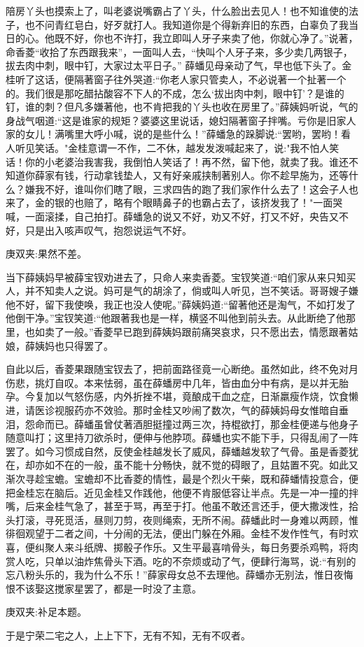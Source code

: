 \begin{parag}
陪房丫头也摸索上了，叫老婆说嘴霸占了丫头，什么脸出去见人！也不知谁使的法子，也不问青红皂白，好歹就打人。我知道你是个得新弃旧的东西，白辜负了我当日的心。他既不好，你也不许打，我立即叫人牙子来卖了他，你就心净了。”说著，命香菱“收拾了东西跟我来”，一面叫人去，“快叫个人牙子来，多少卖几两银子，拔去肉中刺，眼中钉，大家过太平日子。” 薛蟠见母亲动了气，早也低下头了。金桂听了这话，便隔著窗子往外哭道:“你老人家只管卖人，不必说著一个扯著一个的。我们很是那吃醋拈酸容不下人的不成，怎么‘拔出肉中刺，眼中钉’？是谁的钉，谁的刺？但凡多嫌著他，也不肯把我的丫头也收在房里了。”薛姨妈听说，气的身战气咽道:“这是谁家的规矩？婆婆这里说话，媳妇隔著窗子拌嘴。亏你是旧家人家的女儿！满嘴里大呼小喊，说的是些什么！”薛蟠急的跺脚说:“罢哟，罢哟！看人听见笑话。"金桂意谓一不作，二不休，越发发泼喊起来了，说:"我不怕人笑话！你的小老婆治我害我，我倒怕人笑话了！再不然，留下他，就卖了我。谁还不知道你薛家有钱，行动拿钱垫人，又有好亲戚挟制著别人。你不趁早施为，还等什么？嫌我不好，谁叫你们瞎了眼，三求四告的跑了我们家作什么去了！这会子人也来了，金的银的也赔了，略有个眼睛鼻子的也霸占去了，该挤发我了！"一面哭喊，一面滚揉，自己拍打。薛蟠急的说又不好，劝又不好，打又不好，央告又不好，只是出入咳声叹气，抱怨说运气不好。\begin{note}庚双夹:果然不差。\end{note}当下薛姨妈早被薛宝钗劝进去了，只命人来卖香菱。宝钗笑道:“咱们家从来只知买人，并不知卖人之说。妈可是气的胡涂了，倘或叫人听见，岂不笑话。哥哥嫂子嫌他不好，留下我使唤，我正也没人使呢。”薛姨妈道:“留著他还是淘气，不如打发了他倒干净。”宝钗笑道:“他跟著我也是一样，横竖不叫他到前头去。从此断绝了他那里，也如卖了一般。”香菱早已跑到薛姨妈跟前痛哭哀求，只不愿出去，情愿跟著姑娘，薛姨妈也只得罢了。
\end{parag}


\begin{parag}
    自此以后，香菱果跟随宝钗去了，把前面路径竟一心断绝。虽然如此，终不免对月伤悲，挑灯自叹。本来怯弱，虽在薛蟠房中几年，皆由血分中有病，是以并无胎孕。今复加以气怒伤感，内外折挫不堪，竟酿成干血之症，日渐羸瘦作烧，饮食懒进，请医诊视服药亦不效验。那时金桂又吵闹了数次，气的薛姨妈母女惟暗自垂泪，怨命而已。薛蟠虽曾仗著酒胆挺撞过两三次，持棍欲打，那金桂便递与他身子随意叫打；这里持刀欲杀时，便伸与他脖项。薛蟠也实不能下手，只得乱闹了一阵罢了。如今习惯成自然，反使金桂越发长了威风，薛蟠越发软了气骨。虽是香菱犹在，却亦如不在的一般，虽不能十分畅快，就不觉的碍眼了，且姑置不究。如此又渐次寻趁宝蟾。宝蟾却不比香菱的情性，最是个烈火干柴，既和薛蟠情投意合，便把金桂忘在脑后。近见金桂又作践他，他便不肯服低容让半点。先是一冲一撞的拌嘴，后来金桂气急了，甚至于骂，再至于打。他虽不敢还言还手，便大撒泼性，拾头打滚，寻死觅活，昼则刀剪，夜则绳索，无所不闹。薛蟠此时一身难以两顾，惟徘徊观望于二者之间，十分闹的无法，便出门躲在外厢。金桂不发作性气，有时欢喜，便纠聚人来斗纸牌、掷骰子作乐。又生平最喜啃骨头，每日务要杀鸡鸭，将肉赏人吃，只单以油炸焦骨头下酒。吃的不奈烦或动了气，便肆行海骂，说:“有别的忘八粉头乐的，我为什么不乐！”薛家母女总不去理他。薛蟠亦无别法，惟日夜悔恨不该娶这搅家星罢了，都是一时没了主意。\begin{note}庚双夹:补足本题。\end{note}于是宁荣二宅之人，上上下下，无有不知，无有不叹者。
\end{parag}


